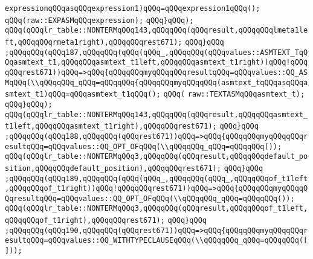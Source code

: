 \verb|expressionqQQqasqQQqexpression1)qQQq=qQQqexpression1qQQq();|\newline
\verb|qQQq(raw::EXPASMqQQqexpression);|\newline
\verb|qQQq}qQQq);|\newline
\verb|qQQq(qQQqlr_table::NONTERMqQQq143,qQQqqQQq(qQQqresult,qQQqqQQqlmeta1left,qQQqqQQqrmeta1right),qQQqqQQqrest671);|\newline
\verb|qQQq}qQQq|\newline
\verb|;qQQqqQQq(qQQq187,qQQqqQQq(qQQq(qQQq_,qQQqqQQq(qQQqvalues::ASMTEXT_TqQQqasmtext_t1,qQQqqQQqasmtext_t1left,qQQqqQQqasmtext_t1right))qQQq!qQQqqQQqrest671))qQQq=>qQQq{qQQqqQQqmyqQQqqQQqresultqQQq=qQQqvalues::QQ_ASMqQQq(\\qQQqqQQq_qQQq=qQQqqQQq{qQQqqQQqmyqQQqqQQq(asmtext_tqQQqasqQQqasmtext_t1)qQQq=qQQqasmtext_t1qQQq();|\newline
\verb|qQQq(|\newline
\verb|raw::TEXTASMqQQqasmtext_t);|\newline
\verb|qQQq}qQQq);|\newline
\verb|qQQq(qQQqlr_table::NONTERMqQQq143,qQQqqQQq(qQQqresult,qQQqqQQqasmtext_t1left,qQQqqQQqasmtext_t1right),qQQqqQQqrest671);|\newline
\verb|qQQq}qQQq|\newline
\verb|;qQQqqQQq(qQQq188,qQQqqQQq(qQQqrest671))qQQq=>qQQq{qQQqqQQqmyqQQqqQQqresultqQQq=qQQqvalues::QQ_OPT_OFqQQq(\\qQQqqQQq_qQQq=qQQqqQQq());|\newline
\verb|qQQq(qQQqlr_table::NONTERMqQQq3,qQQqqQQq(qQQqresult,qQQqqQQqdefault_position,qQQqqQQqdefault_position),qQQqqQQqrest671);|\newline
\verb|qQQq}qQQq|\newline
\verb|;qQQqqQQq(qQQq189,qQQqqQQq(qQQq(qQQq_,qQQqqQQq(qQQq_,qQQqqQQqof_t1left,qQQqqQQqof_t1right))qQQq!qQQqqQQqrest671))qQQq=>qQQq{qQQqqQQqmyqQQqqQQqresultqQQq=qQQqvalues::QQ_OPT_OFqQQq(\\qQQqqQQq_qQQq=qQQqqQQq());|\newline
\verb|qQQq(qQQqlr_table::NONTERMqQQq3,qQQqqQQq(qQQqresult,qQQqqQQqof_t1left,qQQqqQQqof_t1right),qQQqqQQqrest671);|\newline
\verb|qQQq}qQQq|\newline
\verb|;qQQqqQQq(qQQq190,qQQqqQQq(qQQqrest671))qQQq=>qQQq{qQQqqQQqmyqQQqqQQqresultqQQq=qQQqvalues::QQ_WITHTYPECLAUSEqQQq(\\qQQqqQQq_qQQq=qQQqqQQq([]));|\newline
